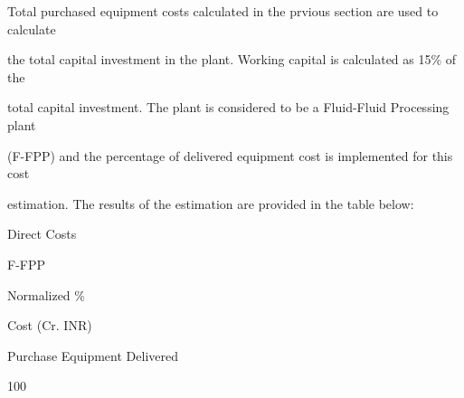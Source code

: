 \documentclass[a4paper,portrait,12pt]{article}
\begin{document}
\begin{flushleft}
Total purchased equipment costs calculated in the prvious section are used to calculate
\end{flushleft}


\begin{flushleft}
the total capital investment in the plant. Working capital is calculated as 15\% of the
\end{flushleft}


\begin{flushleft}
total capital investment. The plant is considered to be a Fluid-Fluid Processing plant
\end{flushleft}


\begin{flushleft}
(F-FPP) and the percentage of delivered equipment cost is implemented for this cost
\end{flushleft}


\begin{flushleft}
estimation. The results of the estimation are provided in the table below:
\end{flushleft}





\begin{flushleft}
Direct Costs
\end{flushleft}





\begin{flushleft}
F-FPP
\end{flushleft}





\begin{flushleft}
Normalized \%
\end{flushleft}





\begin{flushleft}
Cost (Cr. INR)
\end{flushleft}





\begin{flushleft}
Purchase Equipment Delivered
\end{flushleft}





100
\end{document}
